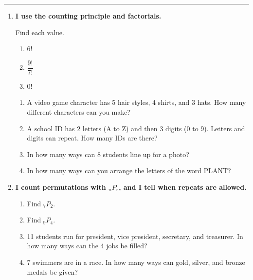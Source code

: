 \documentclass[11pt]{article}
\newcommand{\lessonhead}[1]{\par\vspace{0.6em}{\large\bfseries #1}\par\vspace{0.25em}\hrule\vspace{0.6em}}
\newcommand{\goal}[1]{\textbf{#1}\par\vspace{0.35em}}
\begin{document}
\newpage
\lessonhead{6.5 - Permutations}
\begin{enumerate}[resume]

\item \goal{I use the counting principle and factorials.}
Find each value.
\begin{enumerate}
  \item $6!$ 
  \work{2.5em}
  \item $\dfrac{9!}{7!}$ 
  \work{2.5em}
  \item $0!$ 
  \work{2.5em}
\end{enumerate}
\begin{enumerate}[start=4]
  \item A video game character has 5 hair styles, 4 shirts, and 3 hats. How many different characters can you make?

  \work{4em}
  \item A school ID has 2 letters (A to Z) and then 3 digits (0 to 9). Letters and digits can repeat. How many IDs are there?

  \work{4em}
  \item In how many ways can 8 students line up for a photo?

  \work{4em}
  \item In how many ways can you arrange the letters of the word PLANT?

  \work{4em}
\end{enumerate}

\newpage
\item \goal{I count permutations with ${}_nP_r$, and I tell when repeats are allowed.}
\begin{enumerate}
  \item Find ${}_7P_2$. 
  \work{2.5em}
  \item Find ${}_9P_4$. 
  \work{2.5em}
  \item 11 students run for president, vice president, secretary, and treasurer. In how many ways can the 4 jobs be filled?

  \work{3em}
  \item 7 swimmers are in a race. In how many ways can gold, silver, and bronze medals be given?


\end{enumerate}
\end{enumerate}
\end{document}
